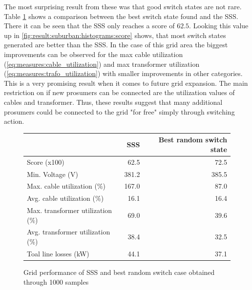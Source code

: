 The most surprising result from these was that good switch states are not rare. Table
\ref{fig:result:suburban:table} shows a comparison between the best switch state found
and the SSS. There it can be seen that the SSS only reaches a score of $62.5$.
Looking this value up in \autoref{fig:result:suburban:histograms:score} shows,
that most switch states generated are better than the SSS. In the case
of this grid area the biggest improvements can be observed for the max cable
utilization (\autoref{eq:measures:cable_utilization}) and max transformer
utilization (\autoref{eq:measures:trafo_utilization}) with smaller improvements
in other categories. This is a very promising result when it comes to future
grid expansion. The main restriction on if new prosumers can be connected are
the utilization values of cables and transformer. Thus, these results suggest
that many additional prosumers could be connected to the grid
"for free" simply through switching action.


\begin{figure}[H]
  \centering
  \begin{tabular}{lrr}
    \toprule
    & SSS & Best random switch state \\
    \midrule
    Score (x100) & 62.5 & 72.5 \\
    Min. Voltage (V) & 381.2 & 385.5 \\
    Max. cable utilization (\%) & 167.0 & 87.0 \\
    Avg. cable utilization (\%) & 16.1 & 16.4 \\
    Max. transformer utilization (\%) & 69.0 & 39.6 \\
    Avg. transformer utilization (\%) & 38.4 & 32.5 \\
    Toal line losses (kW) & 44.1 & 37.1 \\
    \bottomrule
  \end{tabular}
  \caption{
    Grid performance of SSS and best random switch case obtained
    through 1000 samples
  }
  \label{fig:result:suburban:table}
\end{figure}
  

